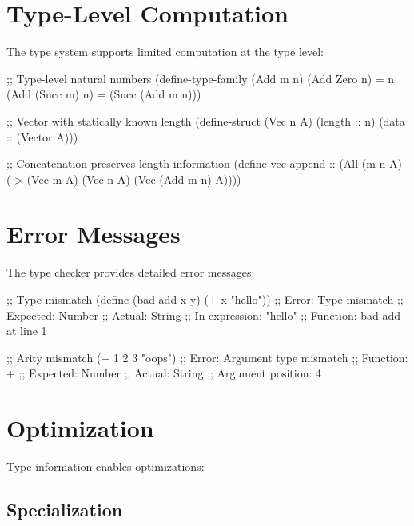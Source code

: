 \section{Type-Level Computation}
\label{sec:type-level}


The type system supports limited computation at the type level:

\begin{example}
\begin{lambdustcode}
;; Type-level natural numbers
(define-type-family (Add m n)
  (Add Zero n) = n
  (Add (Succ m) n) = (Succ (Add m n)))

;; Vector with statically known length
(define-struct (Vec n A) (length :: n) (data :: (Vector A)))

;; Concatenation preserves length information
(define vec-append :: (All (m n A) 
                       (-> (Vec m A) (Vec n A) (Vec (Add m n) A))))
\end{lambdustcode}
\end{example}

\section{Error Messages}
\label{sec:error-messages}

The type checker provides detailed error messages:

\begin{example}
\begin{lambdustcode}
;; Type mismatch
(define (bad-add x y) (+ x "hello"))
;; Error: Type mismatch
;; Expected: Number  
;; Actual: String
;; In expression: "hello"
;; Function: bad-add at line 1

;; Arity mismatch
(+ 1 2 3 "oops")
;; Error: Argument type mismatch
;; Function: +
;; Expected: Number
;; Actual: String  
;; Argument position: 4
\end{lambdustcode}
\end{example}

\section{Optimization}
\label{sec:optimization}

Type information enables optimizations:

\subsection{Specialization}
\label{subsec:specialization}

